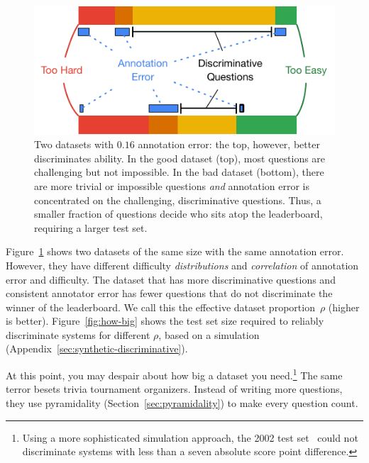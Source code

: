 \begin{figure}[t]
    \centering
    \includegraphics[width=1.0\linewidth]{figures/datasets/error_and_difficulty}
    \caption{Two datasets with $0.16$ annotation error: the top, however, better discriminates  ability.  In the good dataset (top), most questions are challenging but not impossible.  In the bad dataset (bottom), there are more trivial or impossible questions \emph{and} annotation error is concentrated on the challenging, discriminative questions.  Thus, a smaller fraction of questions decide who sits atop the leaderboard, requiring a larger test set.}
    \label{fig:error-and-difficulty}
\end{figure}

Figure~\ref{fig:error-and-difficulty} shows two datasets of the same size with the same annotation error.
However, they have different difficulty \emph{distributions} and \emph{correlation} of annotation error and difficulty.
The dataset that has more discriminative questions and consistent annotator error has fewer questions that do not discriminate the winner of the leaderboard.
We call this the effective dataset proportion~$\rho$ (higher is better).
Figure~\ref{fig:how-big} shows the test set size required to reliably discriminate systems for different $\rho$, based on a simulation (Appendix~\ref{sec:synthetic-discriminative}).

At this point, you may despair about how big a dataset you
need.\footnote{Using a more sophisticated simulation approach, the
   2002  test set~\citep{voorhees-03} could not
  discriminate systems with less than a seven absolute score point
  difference.}
The same terror besets trivia tournament organizers.
Instead of writing more questions, they use pyramidality (Section~\ref{sec:pyramidality}) to make every question count.


